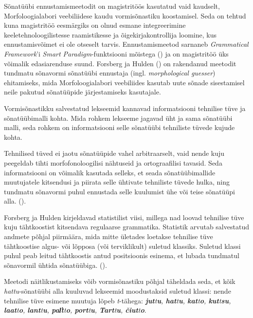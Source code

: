 \documentclass[12pt,a4paper]{article}
\newcommand{\vadja}[1]{\textit{#1}}
\begin{document}
Sõnatüübi ennustamismeetodit on magistritöös kasutatud vaid kaudselt, Morfoloogialabori veebiliidese kaudu vormisõnastiku koostamisel. Seda on tehtud kuna magistritöö eesmärgiks on olnud esmane integreerimine keeletehnoloogilistesse raamistikesse ja õigekirjakontrollija loomine, kus ennustamisvõimet ei ole otseselt tarvis. Ennustamismeetod sarnaneb \textit{Grammatical Framework}'i \textit{Smart Paradigm}-funktsiooni mõistega (\cite{detrez_smart_2012}) ja on magistritöö üks võimalik edasiarenduse suund. Forsberg ja Hulden (\cite{forsberg_deriving_2016}) on rakendanud meetodit tundmatu sõnavormi sõnatüübi ennustaja (ingl. \textit{morphological guesser}) ehitamiseks, mida Morfoloogialabori veebiliides kasutab uute sõnade sisestamisel neile pakutud sõnatüüpide järjestamiseks kasutajale.

Vormisõnastikku salvestatud lekseemid kannavad informatsiooni tehnilise tüve ja sõnatüübimalli kohta. Mida rohkem lekseeme jagavad üht ja sama sõnatüübi malli, seda rohkem on informatsiooni selle sõnatüübi tehniliste tüvede kujude kohta.

Tehnilised tüved ei jaotu sõnatüüpide vahel arbitraarselt, vaid nende kuju peegeldab tihti morfo\-fonoloogilisi nähtuseid ja orto\-graafilisi tavasid. Seda informatsiooni on võimalik kasutada selleks, et seada sõna\-tüübi\-mallide muutujatele kitsendusi ja piirata selle ühtivate tehniliste tüvede hulka, ning tundmatu sõnavormi puhul ennustada selle kuulumist ühe või teise sõnatüüpi alla. (\cite[2579]{forsberg_deriving_2016}).

Forsberg ja Hulden kirjeldavad statistilist viisi, millega nad loovad tehnilise tüve kuju tähtkoostist kitsendava regulaarse grammatika. Statistik arvutab salvestatud andmete põhjal piirmäära, mida mitte ületades loetakse tehnilise tüve tähtkoostise algus- või lõpposa (või terviklikult) suletud klassiks. Suletud klassi puhul peab leitud tähtkoostis antud positsioonis esinema, et lubada tundmatul sõnavormil ühtida sõnatüübiga. (\cite[2580]{forsberg_deriving_2016}).

Meetodi näitlikustamiseks võib vormisõnastiku põhjal täheldada seda, et kõik \textit{hattu}-sõnatüübi alla kuuluvad lekseemid moodustaksid suletud klassi: nende tehnilise tüve esimene muutuja lõpeb \textit{t}-tähega: \vadja{\textbf{jut}t\textbf{u}, \textbf{hat}t\textbf{u}, \textbf{kat}t\textbf{o}, \textbf{kut}t\textbf{su}, \textbf{laat}t\textbf{o}, \textbf{lant}t\textbf{u}, \textbf{pal̕t}t\textbf{o}, \textbf{port}t\textbf{u}, \textbf{Tart}t\textbf{u}, \textbf{čiut}t\textbf{o}}.
\end{document}
